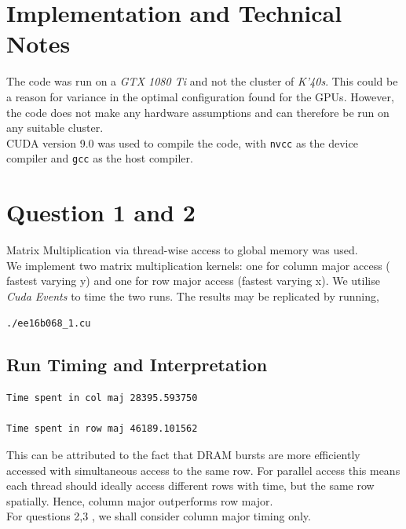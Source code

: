 \section {Implementation and Technical Notes}

The code was run on a \textit{GTX 1080 Ti} and not the cluster of \textit{K'40s}. This could be a reason for variance in the optimal configuration found for the GPUs. However, the code does not make any hardware assumptions and can therefore be run on any suitable cluster. \\

CUDA version 9.0 was used to compile the code, with \lstinline{nvcc} as the device compiler and \lstinline{gcc} as the host compiler.

\section {Question 1 and 2}

Matrix Multiplication via thread-wise access to global memory was used. \\

We implement two matrix multiplication kernels: one for column major access ( fastest varying y) and one for row major access (fastest varying x). We utilise \textit{Cuda Events } to time the two runs. The results may be replicated by running,

\begin{lstlisting}[numbers = none]
./ee16b068_1.cu
\end{lstlisting}

\subsection{Run Timing and Interpretation}

\begin{lstlisting}[numbers = none]
Time spent in col maj 28395.593750

Time spent in row maj 46189.101562
\end{lstlisting}

This can be attributed to the fact that DRAM bursts are more efficiently accessed with simultaneous access to the same row. For parallel access this means each thread should ideally access different rows with time, but the same row spatially. Hence, column major outperforms row major. \\

For questions 2,3 , we shall consider column major timing only. \\

